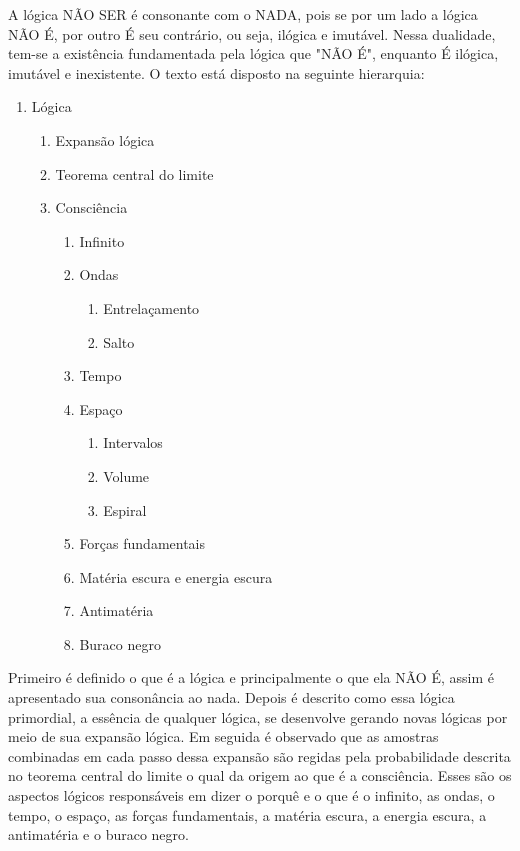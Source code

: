 A lógica NÃO SER é consonante com o NADA, pois se por um lado a lógica NÃO É, por outro É seu contrário, ou seja, ilógica e imutável. Nessa dualidade, tem-se a existência fundamentada pela lógica que "NÃO É", enquanto É ilógica, imutável e inexistente. O texto está disposto na seguinte hierarquia:
	\begin{enumerate}[label*=\arabic*.]
	   \item Lógica
	   \begin{enumerate}[label*=\arabic*.]
		   \item Expansão lógica
		   \item Teorema central do limite
		   \item Consciência
			   \begin{enumerate}[label*=\arabic*.]
				   \item Infinito
				   \item Ondas 
				   \begin{enumerate}[label*=\arabic*.]
				   		\item Entrelaçamento
				   		\item Salto
				   \end{enumerate}  
				   \item Tempo
				   \item Espaço
				   \begin{enumerate}[label*=\arabic*.]
				   		\item Intervalos
					    \item Volume
				   		\item Espiral
				   \end{enumerate} 
				   \item Forças fundamentais
				   \item Matéria escura e energia escura
				   \item Antimatéria
				   \item Buraco negro
			   \end{enumerate}   
	   \end{enumerate}
	\end{enumerate}

Primeiro é definido o que é a lógica e principalmente o que ela NÃO É, assim é apresentado sua consonância ao nada. Depois é descrito como essa lógica primordial, a essência de qualquer lógica, se desenvolve gerando novas lógicas por meio de sua expansão lógica. Em seguida é observado que as amostras combinadas em cada passo dessa expansão são regidas pela probabilidade descrita no teorema central do limite o qual da origem ao que é a consciência. Esses são os aspectos lógicos responsáveis em dizer o porquê e o que é o infinito, as ondas, o tempo, o espaço, as forças fundamentais, a matéria escura, a energia escura, a antimatéria e o buraco negro. 

\bigbreak
